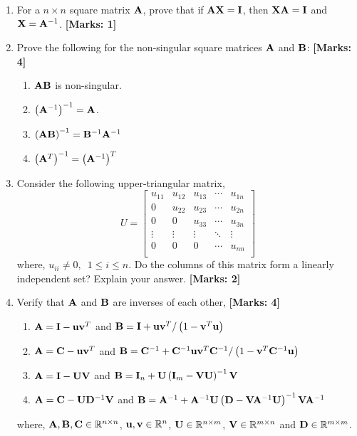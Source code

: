 \documentclass[12pt]{article}
\def\mf{\ensuremath\mathbf}
\def\mb{\ensuremath\mathbb}
\def\lp{\ensuremath\left(}
\def\rp{\ensuremath\right)}
\newcommand{\ct}[1]{\lp #1\rp}
\begin{document}
\begin{enumerate}
    \item For a $n \times n$ square matrix $\mf{A}$, prove that if $\mf{A}\mf{X} = \mf{I}$, then $\mf{X}\mf{A} = \mf{I}$ and $\mf{X} = \mf{A}^{-1}$.  \textbf{[Marks: 1]}

    \item Prove the following for the non-singular square matrices $\mf{A}$ and $\mf{B}$:  \textbf{[Marks: 4]}
    \begin{enumerate}
        \item $\mf{A}\mf{B}$ is non-singular.
        \item $\ct{\mf{A}^{-1}}^{-1} = \mf{A}$.
        \item $\ct{\mf{A}\mf{B}}^{-1} = \mf{B}^{-1}\mf{A}^{-1}$
        \item $\ct{\mf{A}^T}^{-1} = \ct{\mf{A}^{-1}}^T$
    \end{enumerate}

    \item Consider the following upper-triangular matrix, 
    \[ U = \begin{bmatrix}
    u_{11} & u_{12} & u_{13} & \cdots & u_{1n}\\
    0 & u_{22} & u_{23} & \cdots & u_{2n}\\
    0 & 0 & u_{33} & \cdots & u_{3n}\\
    \vdots & \vdots & \vdots & \ddots & \vdots\\
    0 & 0 & 0 & \cdots & u_{nn}\\\end{bmatrix} \]
    where, $u_{ii} \neq 0, \,\,\, 1 \leq i \leq n$. Do the columns of this matrix form a linearly independent set? Explain your answer.  \textbf{[Marks: 2]}

    \item Verify that $\mf{A}$ and $\mf{B}$ are inverses of each other,  \textbf{[Marks: 4]}
    \begin{enumerate}
        \item $\mf{A} = \mf{I} - \mf{u}\mf{v}^T$ and $\mf{B} = \mf{I} + \mf{u}\mf{v}^T / \lp 1 - \mf{v}^T\mf{u} \rp$
        \item $\mf{A} = \mf{C} - \mf{u}\mf{v}^T$ and $\mf{B} = \mf{C}^{-1} + \mf{C}^{-1}\mf{u}\mf{v}^T\mf{C}^{-1} / \lp 1 - \mf{v}^T\mf{C}^{-1}\mf{u} \rp$
        \item $\mf{A} = \mf{I} - \mf{U}\mf{V}$ and $\mf{B} = \mf{I}_{n} + \mf{U}\lp \mf{I}_m - \mf{V}\mf{U}\rp^{-1}\mf{V}$
        \item $\mf{A} = \mf{C} - \mf{U}\mf{D}^{-1}\mf{V}$ and $\mf{B} = \mf{A}^{-1} + \mf{A}^{-1}\mf{U}\lp \mf{D} - \mf{V}\mf{A}^{-1}\mf{U}\rp^{-1}\mf{V}\mf{A}^{-1}$
    \end{enumerate}
    where, $\mf{A}, \mf{B}, \mf{C} \in \mb{R}^{n \times n}$, $\mf{u}, \mf{v} \in \mb{R}^n$, $\mf{U} \in \mb{R}^{n \times m}$, $\mf{V} \in \mb{R}^{m \times n}$ and $\mf{D} \in \mb{R}^{m \times m}$.


\end{enumerate}
\end{document}
